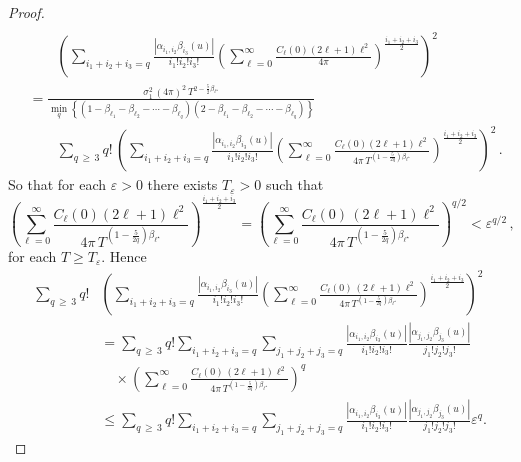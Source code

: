 \documentclass[AHL,Unicode,longabstracts,published]{cedram}
\begin{document}
\begin{proof}
\begin{align*}
\\
&\qquad \left(\sum_{i_{1}+i_{2}+i_{3}=q}\frac{\left|\alpha _{i_{1},i_{2}}\beta _{i_{3}}(u)\right|}{i_{1}!i_{2}!i_{3}!}\left(\sum_{\ell =0}^{\infty }\frac{C_\ell(0)(2\ell +1)\ell ^{2}}{4\pi}\right)^{\frac{i_{1}+i_{2}+i_{3}}{2}}\right) ^{2} \\
&=\frac{\sigma_{1}^{2}\,(4\pi)^{2}\,T^{2-\frac52\beta _{\ell^{\star }}}}{\min_{q}\left\{\left(1-\beta_{\ell _{1}}-\beta_{\ell_{2}}-\cdots -\beta_{\ell_{q}}\right)\left(2-\beta_{\ell_{1}}-\beta _{\ell_{2}}-\cdots -\beta_{\ell_{q}}\right)\right\}}
\\
&\qquad \sum_{q\,\geq\,3}q!\,\left(\sum_{i_{1}+i_{2}+i_{3}=q}\frac{\left|\alpha_{i_{1},i_{2}}\beta_{i_{3}}(u)\right|}{i_{1}!i_{2}!i_{3}!}\left(\sum_{\ell =0}^{\infty}\frac{C_\ell(0)(2\ell +1)\ell^{2}}{4\pi \, T^{\left(1-\frac5{2q}\right)\beta_{\ell^{\star}}}}\right)^{\frac{ i_{1}+i_{2}+i_{3}}{2}}\right)^{2}\,.
\end{align*}
\endgroup
So that for each $\varepsilon>0$ there exists $T_\varepsilon>0$ such that
\[
\left(\sum_{\ell =0}^{\infty }\frac{C_\ell(0)(2\ell +1)\ell ^{2}}{4\pi \, T^{\left(1-\frac5{2q}\right)\beta_{\ell^{\star}}}}\right)^{\frac{ i_{1}+i_{2}+i_{3}}{2}} =\left(\sum_{\ell =0}^{\infty }\frac{ C_\ell(0)\,(2\ell +1)\ell ^{2}}{4\pi \, T^{\left(1-\frac5{2q}\right)\beta_{\ell^{\star}}}}\right)^{q/2}<
\varepsilon^{q/2} \,,
\]
for each $T \ge T_\varepsilon$. Hence
\begingroup
\allowdisplaybreaks
\begin{align*}
\sum_{q\,\geq\,3}q! &\left(\sum_{i_{1}+i_{2}+i_{3}=q}\frac{\left|\alpha _{i_{1},i_{2}}\beta _{i_{3}}(u)\right|}{i_{1}!i_{2}!i_{3}!}\left(\sum_{\ell =0}^{\infty}\frac{C_\ell(0)\,(2\ell +1)\ell ^{2}}{4\pi \, T^{\left(1-\frac5{2q}\right)\beta_{\ell^{\star}}}}\right)^{\frac{ i_{1}+i_{2}+i_{3}}{2}}\right)^{2}
\\
&=\sum_{q\,\geq\,3}q!\sum_{i_{1}+i_{2}+i_{3}=q}\sum_{j_{1}+j_{2}+j_{3}=q}\frac{\left|\alpha _{i_{1},i_{2}}\beta _{i_{3}}(u)\right|}{i_{1}!i_{2}!i_{3}!}\frac{\left|\alpha _{j_{1},j_{2}}\beta _{j_{3}}(u)\right|}{j_{1}!j_{2}!j_{3}!}\\
&\quad\times\left(\sum_{\ell =0}^{\infty }\frac{C_\ell(0)\,(2\ell +1)\ell^{2}}{4\pi \, T^{\left(1-\frac5{2q}\right)\beta_{\ell^{\star}}}}\right)^{q}
\\
&\leq \sum_{q\,\geq\,3}q!\sum_{i_{1}+i_{2}+i_{3}=q}\sum_{j_{1}+j_{2}+j_{3}=q}
\frac{\left|\alpha _{i_{1},i_{2}}\beta _{i_{3}}(u)\right|}{i_{1}!i_{2}!i_{3}!}\frac{\left|\alpha _{j_{1},j_{2}}\beta _{j_{3}}(u)\right|}{j_{1}!j_{2}!j_{3}!}\varepsilon^{q}.
\end{align*}

\end{proof}
\end{document}
